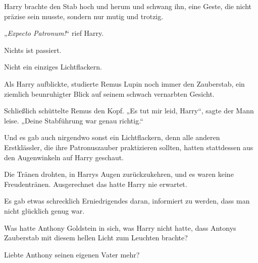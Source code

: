 Harry brachte den Stab hoch und herum und schwang ihn, eine Geste, die nicht präzise sein musste, sondern nur mutig und trotzig.

„\emph{Expecto Patronum!}“ rief Harry.

Nichts ist passiert.

Nicht ein einziges Lichtflackern.

Als Harry aufblickte, studierte Remus Lupin noch immer den Zauberstab, ein ziemlich beunruhigter Blick auf seinem schwach vernarbten Gesicht.

Schließlich schüttelte Remus den Kopf. „Es tut mir leid, Harry“, sagte der Mann leise. „Deine Stabführung war genau richtig.“

Und es gab auch nirgendwo sonst ein Lichtflackern, denn alle anderen Erstklässler, die ihre Patronuszauber praktizieren sollten, hatten stattdessen aus den Augenwinkeln auf Harry geschaut.

Die Tränen drohten, in Harrys Augen zurückzukehren, und es waren keine Freudentränen. Ausgerechnet das hatte Harry nie erwartet.

Es gab etwas schrecklich Erniedrigendes daran, informiert zu werden, dass man nicht glücklich genug war.

Was hatte Anthony Goldstein in sich, was Harry nicht hatte, dass Antonys Zauberstab mit diesem hellen Licht zum Leuchten brachte?

Liebte Anthony seinen eigenen Vater mehr?

